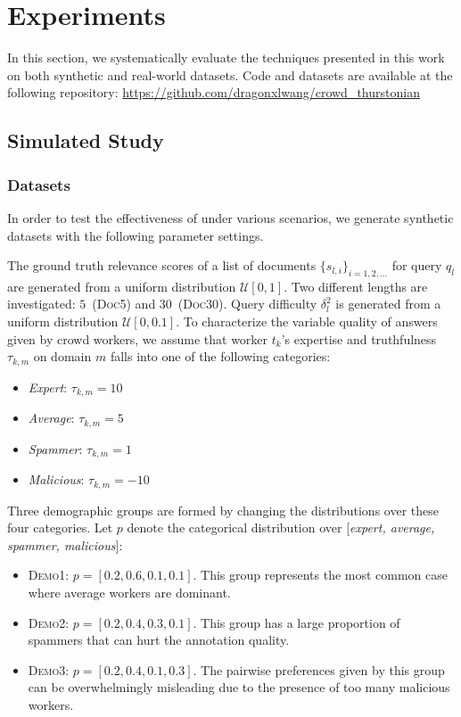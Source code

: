 \section{Experiments} \label{sec::tpp_exp}

In this section, we systematically evaluate the techniques presented in this
work on both synthetic and real-world datasets.  Code and datasets are
available at the following repository:
\url{https://github.com/dragonxlwang/crowd_thurstonian}

\subsection{Simulated Study}

\subsubsection{Datasets} In order to test the effectiveness of \tpp{} under
various scenarios, we generate synthetic datasets with the following parameter
settings.

The ground truth relevance scores of a list of documents
$\{s_{l,i}\}_{i=1,2,...}$ for  query $q_l$  are generated from a uniform
distribution $\mathcal{U}[0, 1]$. Two different lengths are investigated:
$5$~(\textsc{Doc5}) and $30$~(\textsc{Doc30}).  Query difficulty $\delta^2_l$ is
generated from a uniform distribution $\mathcal{U}[0, 0.1]$.  To characterize
the variable quality of answers given by crowd workers, we assume that worker
$t_k$'s expertise and truthfulness $\tau_{k,m}$ on domain $m$ falls into one of
the following categories:

\begin{itemize}
\item \textit{Expert}: $\tau_{k,m} = 10$
\item \textit{Average}: $\tau_{k,m} = 5$
\item \textit{Spammer}: $\tau_{k,m} = 1$
\item \textit{Malicious}: $\tau_{k,m} = -10$
\end{itemize}

Three demographic groups are formed by changing the distributions over these
four categories. Let $p$ denote the categorical distribution over
[\textit{expert, average, spammer, malicious}]:

\begin{itemize}
\item \textsc{Demo1}: $p = [0.2, 0.6, 0.1, 0.1]$. This group represents the most
  common case where average workers are dominant.
\item \textsc{Demo2}: $p = [0.2, 0.4, 0.3, 0.1]$. This group has a large
  proportion of spammers that can hurt the annotation quality.
\item \textsc{Demo3}: $p=[0.2, 0.4, 0.1, 0.3]$. The pairwise preferences given
  by this group can be overwhelmingly misleading due to the presence of too many
  malicious workers.
\end{itemize}

